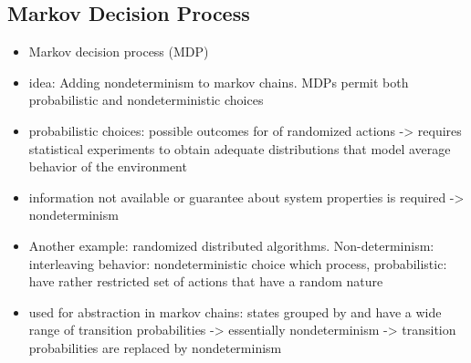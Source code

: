 \documentclass[preview]{standalone}
\begin{document}
	
	
	\subsection{Markov Decision Process} 
	
	
	\begin{itemize}
		\item Markov decision process (MDP) 
		\item idea: Adding nondeterminism to markov chains. MDPs permit both probabilistic and nondeterministic choices 
		\item probabilistic choices: possible outcomes for of randomized actions -> requires statistical experiments to obtain adequate distributions that model average behavior of the environment
		\item information not available or guarantee about system properties is required -> nondeterminism
		\item Another example: randomized distributed algorithms. Non-determinism: interleaving behavior: nondeterministic choice which process, probabilistic: have rather restricted set of actions that have a random nature
		\item used for abstraction in markov chains: states grouped by \atomicprops and have a wide range of transition probabilities -> essentially nondeterminism -> transition probabilities are replaced by nondeterminism		
	\end{itemize}
	
	
\end{document}
